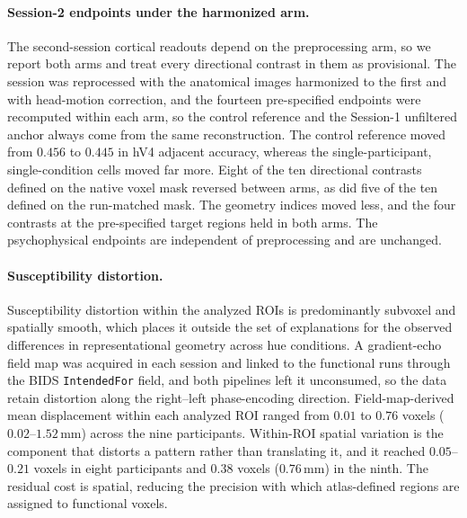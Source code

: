 \paragraph{Session-2 endpoints under the harmonized arm.}
The second-session cortical readouts depend on the preprocessing arm, so we report both arms and treat every directional contrast in them as provisional. The session was reprocessed with the anatomical images harmonized to the first and with head-motion correction, and the fourteen pre-specified endpoints were recomputed within each arm, so the control reference and the Session-1 unfiltered anchor always come from the same reconstruction. The control reference moved from $0.456$ to $0.445$ in hV4 adjacent accuracy, whereas the single-participant, single-condition cells moved far more. Eight of the ten directional contrasts defined on the native voxel mask reversed between arms, as did five of the ten defined on the run-matched mask. The geometry indices moved less, and the four contrasts at the pre-specified target regions held in both arms. The psychophysical endpoints are independent of preprocessing and are unchanged.

\paragraph{Susceptibility distortion.}
Susceptibility distortion within the analyzed ROIs is predominantly subvoxel and spatially smooth, which places it outside the set of explanations for the observed differences in representational geometry across hue conditions. A gradient-echo field map was acquired in each session and linked to the functional runs through the BIDS \texttt{IntendedFor} field, and both pipelines left it unconsumed, so the data retain distortion along the right--left phase-encoding direction. Field-map-derived mean displacement within each analyzed ROI ranged from $0.01$ to $0.76$ voxels ($0.02$--$1.52$\,mm) across the nine participants. Within-ROI spatial variation is the component that distorts a pattern rather than translating it, and it reached $0.05$--$0.21$ voxels in eight participants and $0.38$ voxels ($0.76$\,mm) in the ninth. The residual cost is spatial, reducing the precision with which atlas-defined regions are assigned to functional voxels.


